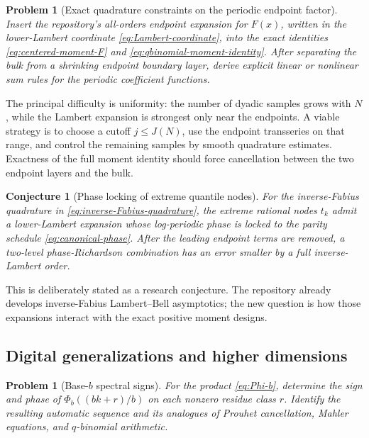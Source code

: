 \documentclass[11pt]{article}
\numberwithin{equation}{section}
\newtheorem{conjecture}[theorem]{Conjecture}
\newtheorem{problem}[theorem]{Problem}
\theoremstyle{definition}
\theoremstyle{remark}
\begin{document}
\begin{problem}[Exact quadrature constraints on the periodic endpoint factor]
\label{prob:Lambert-sum-rules}
Insert the repository's all-orders endpoint expansion for $F(x)$, written in the lower-Lambert coordinate \eqref{eq:Lambert-coordinate}, into the exact identities \eqref{eq:centered-moment-F} and \eqref{eq:qbinomial-moment-identity}.  After separating the bulk from a shrinking endpoint boundary layer, derive explicit linear or nonlinear sum rules for the periodic coefficient functions.
\end{problem}

The principal difficulty is uniformity: the number of dyadic samples grows with $N$, while the Lambert expansion is strongest only near the endpoints.  A viable strategy is to choose a cutoff $j\le J(N)$, use the endpoint transseries on that range, and control the remaining samples by smooth quadrature estimates.  Exactness of the full moment identity should force cancellation between the two endpoint layers and the bulk.

\begin{conjecture}[Phase locking of extreme quantile nodes]
\label{conj:quantile-phase-locking}
For the inverse-Fabius quadrature in \eqref{eq:inverse-Fabius-quadrature}, the extreme rational nodes $t_k$ admit a lower-Lambert expansion whose log-periodic phase is locked to the parity schedule \eqref{eq:canonical-phase}.  After the leading endpoint terms are removed, a two-level phase-Richardson combination has an error smaller by a full inverse-Lambert order.
\end{conjecture}

This is deliberately stated as a research conjecture.  The repository already develops inverse-Fabius Lambert--Bell asymptotics; the new question is how those expansions interact with the exact positive moment designs.

\subsection{Digital generalizations and higher dimensions}

\begin{problem}[Base-$b$ spectral signs]
\label{prob:base-b-signs}
For the product \eqref{eq:Phi-b}, determine the sign and phase of $\Phi_b((bk+r)/b)$ on each nonzero residue class $r$.  Identify the resulting automatic sequence and its analogues of Prouhet cancellation, Mahler equations, and $q$-binomial arithmetic.
\end{problem}
\end{document}
